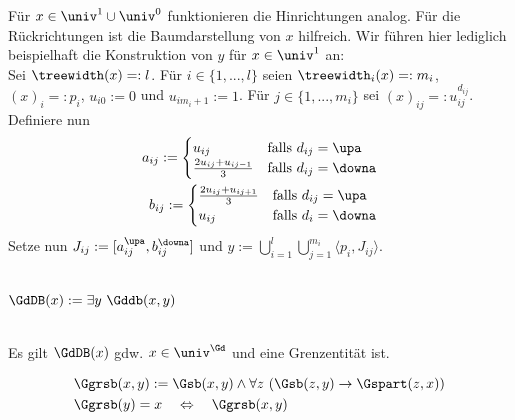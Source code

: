 \begin{bew}
    Für $x \in \univ^1 \cup \univ^0$ funktionieren die Hinrichtungen analog. Für die Rückrichtungen ist die Baumdarstellung von $x$ hilfreich. Wir führen hier lediglich beispielhaft die Konstruktion von $y$ für $x \in \univ^1$ an:\\
    Sei $\treewidth(x) =: l$.
    Für $i \in \{1, ..., l\}$ seien $\treewidth_i(x) =: m_i$, $(x)_i =: p_i$, $u_{i0} := 0$ und $u_{im_i+1} := 1$.
    Für $j \in \{1, ..., m_i\}$ sei $(x)_{ij} =: u_{ij}^{d_{ij}}$.
    Definiere nun
    \begin{align*}
        a_{ij} := 
            \begin{cases}
                u_{ij} & \text{falls $d_{ij} = \upa$}\\
                \frac{2u_{ij} + u_{ij-1}}{3} & \text{falls $d_{ij} = \downa$}
            \end{cases}\\
        b_{ij} := 
            \begin{cases}
                \frac{2u_{ij} + u_{ij+1}}{3} & \text{falls $d_{ij} = \upa$}\\
                u_{ij} & \text{falls $d_i = \downa$}
            \end{cases}
    \end{align*}
    Setze nun $J_{ij} := [a_{ij}^\upa, b_{ij}^\downa]$ und $y := \bigcup_{i=1}^{l} \bigcup_{j=1}^{m_i} \langle p_i,J_{ij} \rangle$.
\end{bew}



\begin{erin}\ \\
    $\GdDB(x) := \exists y\ \Gddb(x,y)$
\end{erin}

\begin{hyp}\ \\
    Es gilt $\GdDB(x)$ gdw. $x \in \univ^{\Gd}$ und eine Grenzentität ist.
\end{hyp}


\begin{erin}
    \begin{align*}
        &\Ggrsb(x,y) := \Gsb(x,y) \wedge \forall z\ (\Gsb(z,y) \to \Gspart(z,x))\\
        &\Ggrsb(y) = x \quad \Leftrightarrow \quad \Ggrsb(x,y)
    \end{align*}
\end{erin}

